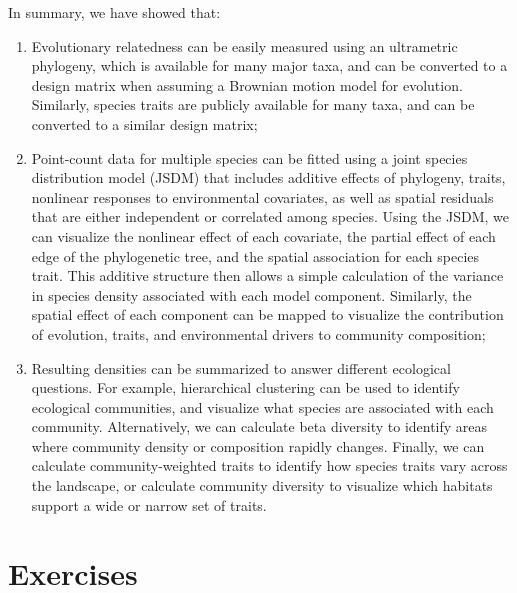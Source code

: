 In summary, we have showed that:
\begin{enumerate}
    \item Evolutionary relatedness can be easily measured using an ultrametric phylogeny, which is available for many major taxa, and can be converted to a design matrix when assuming a Brownian motion model for evolution.  Similarly, species traits are publicly available for many taxa, and can be converted to a similar design matrix;

    \item Point-count data for multiple species can be fitted using a joint species distribution model (JSDM) that includes additive effects of phylogeny, traits, nonlinear responses to environmental covariates, as well as spatial residuals that are either independent or correlated among species.  Using the JSDM, we can visualize the nonlinear effect of each covariate, the partial effect of each edge of the phylogenetic tree, and the spatial association for each species trait.  This additive structure then allows a simple calculation of the variance in species density associated with each model component.  Similarly, the spatial effect of each component can be mapped to visualize the contribution of evolution, traits, and environmental drivers to community composition;

    \item Resulting densities can be summarized to answer different ecological questions.  For example, hierarchical clustering can be used to identify ecological communities, and visualize what species are associated with each community.  Alternatively, we can calculate beta diversity to identify areas where community density or composition rapidly changes.  Finally, we can calculate community-weighted traits to identify how species traits vary across the landscape, or calculate community diversity to visualize which habitats support a wide or narrow set of traits.  
\end{enumerate}

\section{Exercises}

